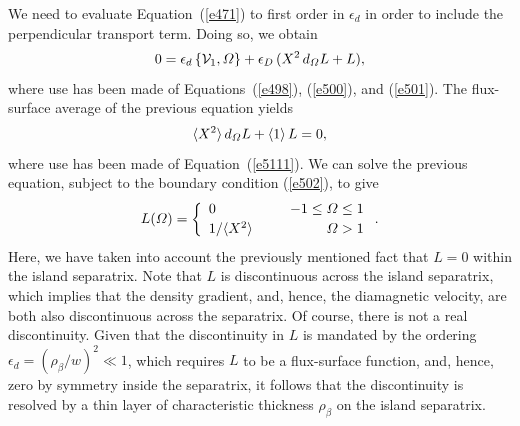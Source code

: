 \documentclass[notitlepage,12pt]{article}
\begin{document}
We need to evaluate Equation~(\ref{e471}) to first order in $\epsilon_d$ in order to include the perpendicular transport term. Doing so,
we obtain
\begin{equation}
0= \epsilon_d\,\{{\cal V}_1, {\mit\Omega}\} + \epsilon_D\,(X^2\,d_{\mit\Omega} L + L),
\end{equation}
where use has been made of Equations~(\ref{e498}), (\ref{e500}),  and (\ref{e501}). The flux-surface average of the
previous equation yields
\begin{equation}
\langle X^2\rangle\,d_{\mit\Omega} L +\langle 1\rangle\,L = 0,
\end{equation}
where use has been made of Equation~(\ref{e5111}). 
We can solve the previous equation, subject to the boundary condition (\ref{e502}), to give
\begin{equation}\label{e526}
L({\mit\Omega})=\left\{
\begin{array}{llr}
0&&-1\leq {\mit\Omega}\leq 1\\[0.5ex]
1/\langle X^2\rangle&~~&{\mit\Omega}>1
\end{array}\right..
\end{equation}
Here, we have taken into account the previously mentioned fact that $L=0$ within the island separatrix.
Note that $L$ is discontinuous across the island separatrix, which implies that the density gradient, and, hence,
the diamagnetic velocity, are both also discontinuous across the separatrix. Of course, there is not a real
discontinuity. Given that the discontinuity in $L$ is mandated by the ordering $\epsilon_d=(\rho_\beta/w)^2\ll 1$, which
requires $L$ to be a flux-surface function, and, hence, zero by symmetry inside the separatrix, it follows that the discontinuity is resolved by a thin layer of characteristic thickness $\rho_\beta$ on the island
separatrix.
\end{document}
